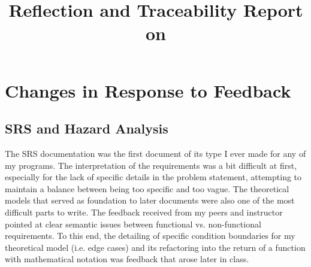 \documentclass{article}
\title{Reflection and Traceability Report on \progname}
\author{\authname}
\date{}
\begin{document}
\maketitle

\section{Changes in Response to Feedback}
\subsection{SRS and Hazard Analysis}

The SRS documentation was the first document of its type I ever made for any 
of my programs. The interpretation of the requirements was a bit difficult at first, 
especially for the lack of specific details in the problem statement, attempting to maintain 
a balance between being too specific and too vague. The theoretical models that served as 
foundation to later documents were also one of the most difficult parts to write. 
The feedback received from my peers and instructor pointed at clear semantic issues 
between functional vs. non-functional requirements. To this end, the detailing of specific 
condition boundaries for my theoretical model (i.e. edge cases) and its refactoring
into the return of a function with mathematical notation was feedback that arose later in 
class.
\end{document}
